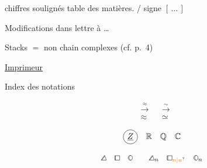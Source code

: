 chiffres soulignés  table des matières. \hfill / signe $[\,\ldots\,]$

Modifications  dans lettre à \ldots

Stacks $=$ non  chain complexes (cf. p.~4)
\clearpage
\begin{center}\uline{Imprimeur}\end{center}
\begin{center}\end{center}
\clearpage
Index des notations

\[
\begin{aligned}
&\overset{\approx}{\longrightarrow} &&\overset{\sim}{\longrightarrow}\\
&\approx &&\simeq
\end{aligned}
\]

\[
\tikz[baseline=(z.base)]{\node[draw,circle,inner sep=2pt] (z) {$\underline{Z}$};}
\quad\mathbb{R}\quad\mathbb{Q}\quad\mathbb{C}
\]

\[
\mathord{\tikz[x=1ex,y=1ex,baseline=0pt]{\draw (0,0)--(.96,1.35)--(1.48,0)--cycle (.19,0)--(1.02,1.17);}}\quad \mathord{\tikz[x=1ex,y=1ex,baseline=0pt]{\draw (0,0) rectangle (1.38,1.26) (.19,0)--(.19,1.26);}}\quad \mathord{\tikz[x=1ex,y=1ex,baseline=0pt]{\draw (0.65,0.65) ellipse (.61 and .72) (.76,1.35) .. controls (.13,1.04) and (.19,.30) .. (.73,-.05);}}\qquad \mathord{\tikz[x=1ex,y=1ex,baseline=0pt]{\draw (0,0)--(.96,1.35)--(1.48,0)--cycle (.19,0)--(1.02,1.17);}}_n\quad \mathord{\tikz[x=1ex,y=1ex,baseline=0pt]{\draw (0,0) rectangle (1.38,1.26) (.19,0)--(.19,1.26);}}_{\unsure{n|u}}\quad \mathord{\tikz[x=1ex,y=1ex,baseline=0pt]{\draw (0.65,0.65) ellipse (.61 and .72) (.76,1.35) .. controls (.13,1.04) and (.19,.30) .. (.73,-.05);}}_n
\]

